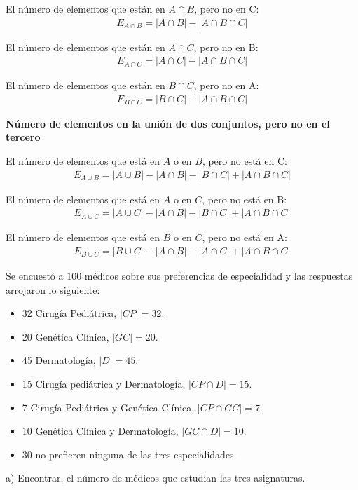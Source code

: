 \noindent El número de elementos que están en $A\cap B$, pero no en C:\\
\begin{eqnarray}
E_{A\cap B}=|A\cap B|-|A\cap B\cap C|
\end{eqnarray}

\noindent El número de elementos que están en $A\cap C$, pero no en B:\\
\begin{eqnarray}
E_{A\cap C}=|A\cap C|-|A\cap B\cap C|
\end{eqnarray}

\noindent El número de elementos que están en $B\cap C$, pero no en A:\\
\begin{eqnarray}
E_{B\cap C}=|B\cap C|-|A\cap B\cap C|
\end{eqnarray}

\begin{center}
\textbf{Número de elementos en la unión de dos conjuntos, pero no en el tercero}\\
\end{center}

\noindent El número de elementos que está en $A$ o en $B$, pero no está en C:\\
\begin{eqnarray}
E_{A\cup B}=|A\cup B|-|A\cap B|-|B\cap C|+|A\cap B\cap C|
\end{eqnarray}

\noindent El número de elementos que está en $A$ o en $C$, pero no está en B:\\
\begin{eqnarray}
E_{A\cup C}=|A\cup C|-|A\cap B|-|B\cap C|+|A\cap B\cap C|
\end{eqnarray}

\noindent El número de elementos que está en $B$ o en $C$, pero no está en A:\\
\begin{eqnarray}
E_{B\cup C}=|B\cup C|-|A\cap B|-|A\cap C|+|A\cap B\cap C|
\end{eqnarray}

\begin{myexample}
Se encuestó a $100$ médicos sobre sus preferencias de especialidad y las respuestas arrojaron lo siguiente:
\end{myexample}
\begin{itemize}
	\item 32 Cirugía Pediátrica, $|CP|=32$.
	\item 20 Genética Clínica, $|GC|=20$.
	\item 45 Dermatología, $|D|=45$.
	\item 15 Cirugía pediátrica y Dermatología, $|CP\cap D|=15$.
	\item 7 Cirugía Pediátrica y Genética Clínica, $|CP\cap GC|=7$.
	\item 10 Genética Clínica y Dermatología, $|GC\cap D|=10$.
	\item 30 no prefieren ninguna de las tres especialidades.
\end{itemize}
\noindent a) Encontrar, el número de médicos que estudian las tres asignaturas.\\

